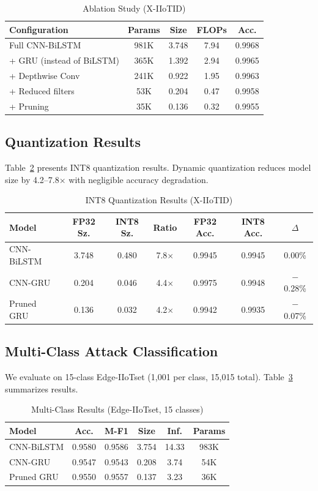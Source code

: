 \documentclass[preprint,12pt]{elsarticle}
\begin{document}
\begin{table}[hbt]
\centering
\caption{Ablation Study (X-IIoTID)}
\label{tab:ablation}
\begin{tabular}{lcccc}
\toprule
Configuration & Params & Size & FLOPs & Acc. \\
\midrule
Full CNN-BiLSTM & 981K & 3.748 & 7.94 & 0.9968 \\
+ GRU (instead of BiLSTM) & 365K & 1.392 & 2.94 & 0.9965 \\
+ Depthwise Conv & 241K & 0.922 & 1.95 & 0.9963 \\
+ Reduced filters & 53K & 0.204 & 0.47 & 0.9958 \\
+ Pruning & 35K & 0.136 & 0.32 & 0.9955 \\
\bottomrule
\end{tabular}
\end{table}

\subsection{Quantization Results}

Table~\ref{tab:quant} presents INT8 quantization results. Dynamic quantization reduces model size by 4.2--7.8$\times$ with negligible accuracy degradation.

\begin{table}[hbt]
\centering
\caption{INT8 Quantization Results (X-IIoTID)}
\label{tab:quant}
\begin{tabular}{lcccccc}
\toprule
Model & FP32 Sz. & INT8 Sz. & Ratio & FP32 Acc. & INT8 Acc. & $\Delta$ \\
\midrule
CNN-BiLSTM & 3.748 & 0.480 & 7.8$\times$ & 0.9945 & 0.9945 & 0.00\% \\
CNN-GRU & 0.204 & 0.046 & 4.4$\times$ & 0.9975 & 0.9948 & $-$0.28\% \\
Pruned GRU & 0.136 & 0.032 & 4.2$\times$ & 0.9942 & 0.9935 & $-$0.07\% \\
\bottomrule
\end{tabular}
\end{table}

\subsection{Multi-Class Attack Classification}
\label{sec:multiclass}

We evaluate on 15-class Edge-IIoTset (1,001 per class, 15,015 total). Table~\ref{tab:multiclass} summarizes results.

\begin{table}[hbt]
\centering
\caption{Multi-Class Results (Edge-IIoTset, 15 classes)}
\label{tab:multiclass}
\begin{tabular}{lccccc}
\toprule
Model & Acc. & M-F1 & Size & Inf. & Params \\
\midrule
CNN-BiLSTM & 0.9580 & 0.9586 & 3.754 & 14.33 & 983K \\
CNN-GRU & 0.9547 & 0.9543 & 0.208 & 3.74 & 54K \\
Pruned GRU & 0.9550 & 0.9557 & 0.137 & 3.23 & 36K \\
\bottomrule
\end{tabular}
\end{table}
\end{document}
